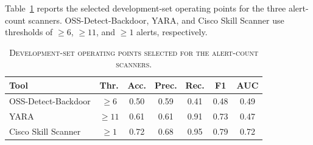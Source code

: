 Table~\ref{tab:training-threshold-base-tools} reports the selected
development-set operating points for the three alert-count scanners.
OSS-Detect-Backdoor, YARA, and Cisco Skill Scanner use thresholds of
$\geq 6$, $\geq 11$, and $\geq 1$ alerts, respectively.


\begin{table}[!t]
\centering
\caption{\textsc{Development-set operating points selected for the
alert-count scanners.}}
\label{tab:training-threshold-base-tools}

\scriptsize
\setlength{\tabcolsep}{5.4pt}
\renewcommand{\arraystretch}{1.05}

\begin{tabularx}{\columnwidth}{
>{\RaggedRight\arraybackslash}X
c c c c c c
}
\toprule
\textbf{Tool}
& \textbf{Thr.}
& \textbf{Acc.}
& \textbf{Prec.}
& \textbf{Rec.}
& \textbf{F1}
& \textbf{AUC} \\
\midrule

OSS-Detect-Backdoor
& $\geq 6$
& 0.50
& 0.59
& 0.41
& 0.48
& 0.49 \\

\rowcolor[HTML]{F2F2F2}
YARA
& $\geq 11$
& 0.61
& 0.61
& 0.91
& 0.73
& 0.47 \\

Cisco Skill Scanner
& $\geq 1$
& 0.72
& 0.68
& 0.95
& 0.79
& 0.72 \\

\bottomrule
\end{tabularx}
\end{table}



